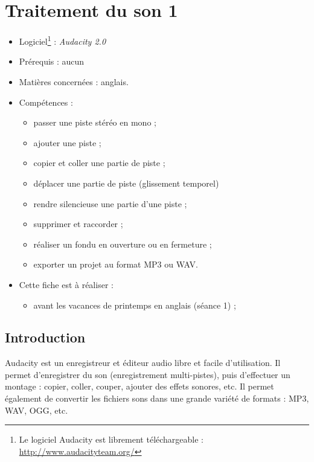 \chapter{Traitement du son 1}  


{\footnotesize
\begin{itemize}
\item Logiciel\footnote{Le logiciel Audacity est librement téléchargeable : \url{http://www.audacityteam.org/}} : \emph{Audacity 2.0} 
\item Prérequis : aucun
\item Matières concernées : anglais.
\item Compétences : 
        \begin{itemize}
        \item passer une piste stéréo en mono ;
        \item ajouter une piste ;
        \item copier et coller une partie de piste ;
        \item déplacer une partie de piste (glissement temporel)
        \item rendre silencieuse une partie d'une piste ;
        \item supprimer et raccorder ;
        \item réaliser un fondu en ouverture ou en fermeture ;
        \item exporter un projet au format MP3 ou WAV.
        \end{itemize}
\item Cette fiche est à réaliser :
        \begin{itemize}
        \item avant les vacances de printemps en anglais (séance 1) ;
        \end{itemize}
\end{itemize}
}%



\section{Introduction}

Audacity est un enregistreur et éditeur audio libre et facile d'utilisation. Il permet d'enregistrer du son (enregistrement multi-pistes), puis d'effectuer un montage : copier, coller, couper, ajouter des effets sonores, etc. Il permet également de convertir les fichiers sons dans une grande variété de formats : MP3, WAV, OGG, etc. 

